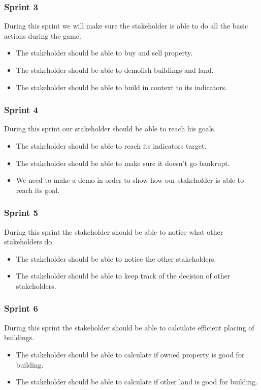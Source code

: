 \subsubsection{Sprint 3}
During this sprint we will make sure the stakeholder is able to do all the basic actions during the game.
\begin{itemize}
	\item The stakeholder should be able to buy and sell property.
	\item The stakeholder should be able to demolish buildings and land.
	\item The stakeholder should be able to build in context to its indicators.
\end{itemize}

\subsubsection{Sprint 4}
During this sprint our stakeholder should be able to reach his goals.
\begin{itemize}
	\item The stakeholder should be able to reach its indicators target.
	\item The stakeholder should be able to make sure it doesn't go bankrupt.
	\item We need to make a demo in order to show how our stakeholder is able to reach its goal.
\end{itemize} 

\subsubsection{Sprint 5}
During this sprint the stakeholder should be able to notice what other stakeholders do.
\begin{itemize}
	\item The stakeholder should be able to notice the other stakeholders.
	\item The stakeholder should be able to keep track of the decision of other stakeholders.
\end{itemize}

\subsubsection{Sprint 6}
During this sprint the stakeholder should be able to calculate efficient placing of buildings.
\begin{itemize}
	\item The stakeholder should be able to calculate if owned property is good for building.
	\item The stakeholder should be able to calculate if other land is good for building.
\end{itemize}

